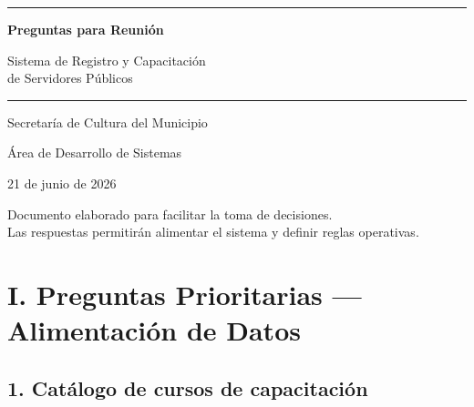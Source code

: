 \documentclass[12pt,letterpaper]{article}
\begin{document}
\begin{titlepage}
\centering
\vspace*{3cm}

{\color{azulgob}\rule{\textwidth}{2pt}}

\vspace{1.5cm}

{\Huge\bfseries\color{azulgob} Preguntas para Reunión}

\vspace{0.8cm}

{\Large Sistema de Registro y Capacitación\\de Servidores Públicos}

\vspace{1.5cm}

{\color{azulgob}\rule{\textwidth}{2pt}}

\vspace{2cm}

{\large Secretaría de Cultura del Municipio}

\vspace{0.5cm}

{\large\color{grissuave} Área de Desarrollo de Sistemas}

\vspace{2cm}

{\large 21 de junio de 2026}

\vfill

{\small\color{grissuave} Documento elaborado para facilitar la toma de decisiones.\\Las respuestas permitirán alimentar el sistema y definir reglas operativas.}

\end{titlepage}


\section{I. Preguntas Prioritarias --- Alimentación de Datos}

\subsection{1. Catálogo de cursos de capacitación}
\end{document}

